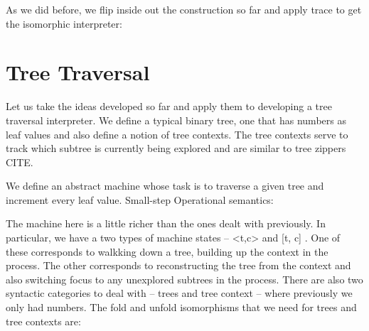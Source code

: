 \documentclass{llncs}
\begin{document}
As we did before, we flip inside out the construction so far and
apply {{trace}} to get the isomorphic interpreter:

\begin{center}
\end{center}


\section{Tree Traversal}

Let us take the ideas developed so far and apply them to developing a
tree traversal interpreter. We define a typical binary tree, one that
has numbers as leaf values and also define a notion of tree
contexts. The tree contexts serve to track which subtree is currently
being explored and are similar to tree zippers CITE.

%

We define an abstract machine whose task is to traverse a given tree
and increment every leaf value. Small-step Operational semantics:


The machine here is a little richer than the ones dealt with
previously. In particular, we have a two types of machine states --
{{<t,c>}} and {{ {[t, c]} }}. One of these corresponds to walkking
down a tree, building up the context in the process. The other
corresponds to reconstructing the tree from the context and also
switching focus to any unexplored subtrees in the process. There are
also two syntactic categories to deal with -- trees and tree context
-- where previously we only had numbers. The {{fold}} and {{unfold}}
isomorphisms that we need for trees and tree contexts are:
\end{document}
